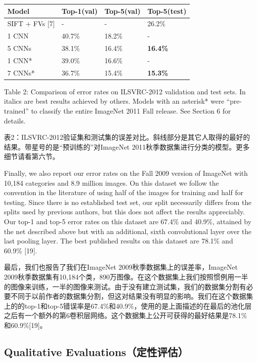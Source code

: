 \documentclass[12pt,a4paper,UTF8,twoside]{book}
\begin{document}
\begin{longtable}[]{@{}llll@{}}
\toprule
\textbf{Model} & \textbf{Top-1(val)} & \textbf{Top-5(val)} & \textbf{Top-5(test)}\tabularnewline
\midrule
\endhead
SIFT + FVs {[}7{]} & - & - & 26.2\%\tabularnewline
1 CNN & 40.7\% & 18.2\% & -\tabularnewline
5 CNNs & 38.1\% & 16.4\% & \textbf{16.4\%}\tabularnewline
1 CNN* & 39.0\% & 16.6\% & -\tabularnewline
7 CNNs* & 36.7\% & 15.4\% & \textbf{15.3\%}\tabularnewline
\bottomrule
\end{longtable}

Table 2: Comparison of error rates on ILSVRC-2012 validation and test sets. In italics are best results achieved by others. Models with an asterisk* were ``pre-trained'' to classify the entire ImageNet 2011 Fall release. See Section 6 for details.

表2：ILSVRC-2012验证集和测试集的误差对比。斜线部分是其它人取得的最好的结果。带星号的是``预训练的''对ImageNet 2011秋季数据集进行分类的模型。更多细节请看第六节。

Finally, we also report our error rates on the Fall 2009 version of ImageNet with 10,184 categories and 8.9 million images. On this dataset we follow the convention in the literature of using half of the images for training and half for testing. Since there is no established test set, our split necessarily differs from the splits used by previous authors, but this does not affect the results appreciably. Our top-1 and top-5 error rates on this dataset are 67.4\% and 40.9\%, attained by the net described above but with an additional, sixth convolutional layer over the last pooling layer. The best published results on this dataset are 78.1\% and 60.9\% {[}19{]}.

最后，我们也报告了我们在ImageNet 2009秋季数据集上的误差率，ImageNet 2009秋季数据集有10,184个类，890万图像。在这个数据集上我们按照惯例用一半的图像来训练，一半的图像来测试。由于没有建立测试集，我们的数据集分割有必要不同于以前作者的数据集分割，但这对结果没有明显的影响。我们在这个数据集上的的top-1和top-5错误率是67.4\%和40.9\%，使用的是上面描述的在最后的池化层之后有一个额外的第6卷积层网络。这个数据集上公开可获得的最好结果是78.1\%和60.9\%{[}19{]}。

\hypertarget{qualitative-evaluationsux5b9aux6027ux8bc4ux4f30}{%
\subsection{Qualitative Evaluations（定性评估）}\label{qualitative-evaluationsux5b9aux6027ux8bc4ux4f30}}
\end{document}
